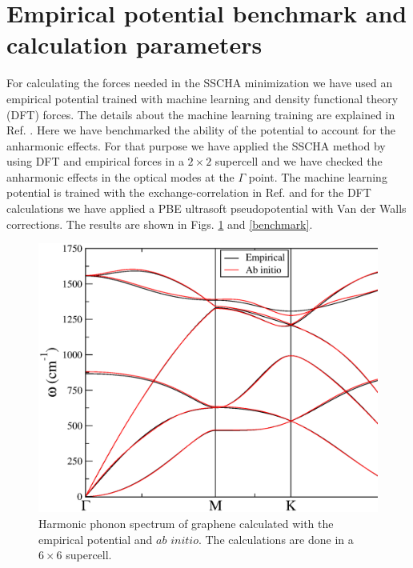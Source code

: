 \section{Empirical potential benchmark and calculation parameters}

For calculating the forces needed in the SSCHA minimization\cite{errea2014anharmonic} we have used an empirical 
potential trained with machine learning and density functional theory (DFT) forces. The details about the machine 
learning training are explained in Ref. \cite{rowe2018development}. Here we have benchmarked the ability of 
the potential to account for the anharmonic effects. For that purpose we have applied the SSCHA method by using 
DFT and empirical forces in a $2\times2$ supercell and we have checked the anharmonic effects in the optical 
modes at the $\Gamma$ point. The machine learning potential is trained with the exchange-correlation in 
Ref. \cite{dion2004van} and for the DFT calculations we have applied a PBE\cite{perdew1996generalized} 
ultrasoft pseudopotential\cite{vanderbilt1990soft} with Van der Walls corrections\cite{barone2009role}. The 
results are shown in Figs. \ref{benchmark-spectrum} and \ref{benchmark}.
\begin{figure}[ht]
\includegraphics[width=0.99\linewidth]{Figures/abinito-vs-empirical.eps}
\caption[Harmonic phonon spectrum of graphene calculated with the empirical                                 
        potential and $ab$ $initio$.]{Harmonic phonon spectrum of graphene calculated with the empirical potential 
	and $ab$ $initio$. The calculations are done in a $6\times6$ supercell.}
\label{benchmark-spectrum}
\end{figure}
